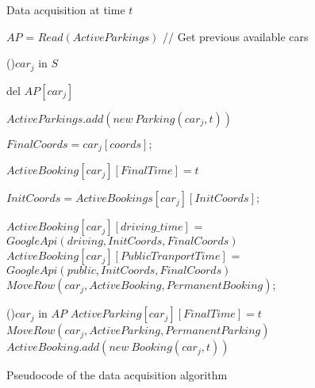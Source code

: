 \begin{figure}[t!]
 \scriptsize
  \begin{algorithm}[H]
   	\caption{Data acquisition at time $t$}
	\BlankLine

	$AP$ = $Read(ActiveParkings)$ // Get previous available cars
	
	\For(){$car_j$ in $S$}
	{
		{
			del $AP[car_j]$\;
		}
		\Else
		{
			$ActiveParkings.add(new~Parking(car_j,t))$\;		
			{
				$FinalCoords = car_j[coords];$
				
				$ActiveBooking[car_j][FinalTime] = t$\;
				
				$InitCoords = ActiveBookings[car_j][InitCoords];$	
						
				{
					$ActiveBooking[car_j][driving\_time]$ = $GoogleApi(driving,InitCoords,FinalCoords)$\;
					$ActiveBooking[car_j][PublicTranportTime]$ = $GoogleApi(public,InitCoords,FinalCoords)$\;
				}
				$MoveRow(car_j,ActiveBooking,PermanentBooking)$;
			}
			}
	}
	\For(){$car_j$ in $AP$}
	{
		$ActiveParking[car_j][FinalTime] = t$\;
		$MoveRow(car_j,ActiveParking,PermanentParking)$\;
		$ActiveBooking.add(new~Booking(car_j,t))$\;		
	}
  \end{algorithm}
   \caption{Pseudocode of the data acquisition algorithm}
   \label{fig:c2_pseudocodeCarInfoUpdate}
\end{figure}

